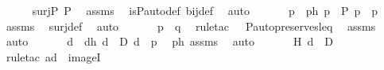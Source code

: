 \begin{isabellebody}
\ \ \isamarkupfalse%
\ {\isachardoublequoteopen}{\isasympi}\ {\isasymin}\ surj{\isacharparenleft}{\kern0pt}P{\isacharcomma}{\kern0pt}\ P{\isacharparenright}{\kern0pt}{\isachardoublequoteclose}\ \isamarkupfalse%
\ assms\ \isamarkupfalse%
\ is{\isacharunderscore}{\kern0pt}P{\isacharunderscore}{\kern0pt}auto{\isacharunderscore}{\kern0pt}def\ bij{\isacharunderscore}{\kern0pt}def\ \isamarkupfalse%
\ auto\ \isanewline
\ \ \isamarkupfalse%
\ \isamarkupfalse%
\ p{\isacharprime}{\kern0pt}\ \ p{\isacharprime}{\kern0pt}h{\isacharcolon}{\kern0pt}\ {\isachardoublequoteopen}p{\isacharprime}{\kern0pt}\ {\isasymin}\ P{\isachardoublequoteclose}\ {\isachardoublequoteopen}{\isasympi}{\isacharbackquote}{\kern0pt}p{\isacharprime}{\kern0pt}\ {\isacharequal}{\kern0pt}\ p{\isachardoublequoteclose}\ \isamarkupfalse%
\ assms\ \isamarkupfalse%
\ surj{\isacharunderscore}{\kern0pt}def\ \isamarkupfalse%
\ auto\ \isanewline
\ \ \isamarkupfalse%
\ \isamarkupfalse%
\ {\isachardoublequoteopen}p{\isacharprime}{\kern0pt}\ {\isasympreceq}\ q{\isachardoublequoteclose}\ \isamarkupfalse%
\ {\isacharparenleft}{\kern0pt}rule{\isacharunderscore}{\kern0pt}tac\ {\isasympi}{\isacharequal}{\kern0pt}{\isasympi}\ \ P{\isacharunderscore}{\kern0pt}auto{\isacharunderscore}{\kern0pt}preserves{\isacharunderscore}{\kern0pt}leq{\isacharprime}{\kern0pt}{\isacharparenright}{\kern0pt}\ \isamarkupfalse%
\ assms\ \isamarkupfalse%
\ auto\ \isamarkupfalse%
\isanewline
\ \ \isamarkupfalse%
\ \isamarkupfalse%
\ d\ \ dh{\isacharcolon}{\kern0pt}\ {\isachardoublequoteopen}d\ {\isasymin}\ D{\isachardoublequoteclose}\ {\isachardoublequoteopen}d\ {\isasympreceq}\ p{\isacharprime}{\kern0pt}{\isachardoublequoteclose}\ \isamarkupfalse%
\ p{\isacharprime}{\kern0pt}h\ assms\ \isamarkupfalse%
\ auto\ \isanewline
\ \ \isamarkupfalse%
\ \isamarkupfalse%
\ H{\isacharcolon}{\kern0pt}\ {\isachardoublequoteopen}{\isasympi}{\isacharbackquote}{\kern0pt}d\ {\isasymin}\ {\isasympi}{\isacharbackquote}{\kern0pt}{\isacharbackquote}{\kern0pt}D{\isachardoublequoteclose}\ \isamarkupfalse%
\ {\isacharparenleft}{\kern0pt}rule{\isacharunderscore}{\kern0pt}tac\ a{\isacharequal}{\kern0pt}d\ \ imageI{\isacharparenright}{\kern0pt}\ \isanewline

\end{isabellebody}
